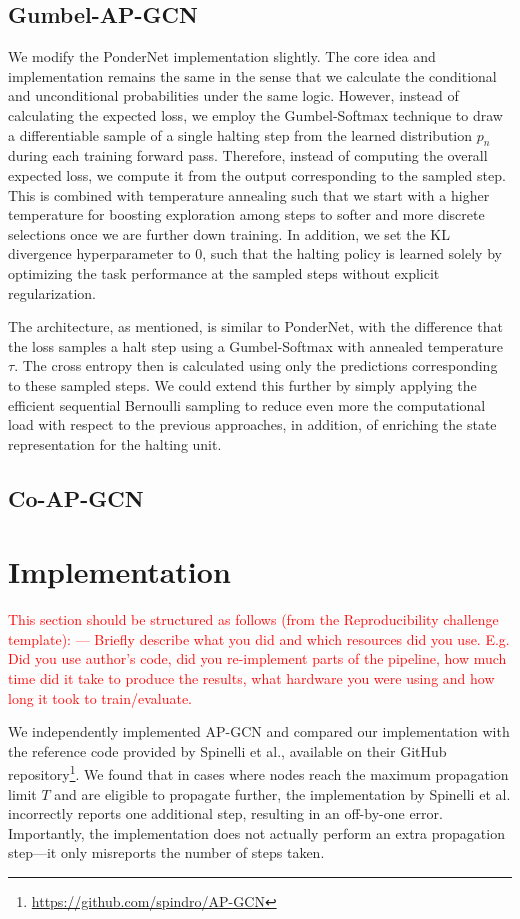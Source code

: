 \documentclass{gdl}
\begin{document}
\subsection{Gumbel-AP-GCN}
We modify the PonderNet implementation slightly. The core idea and implementation remains the same in the sense that we calculate the conditional and unconditional probabilities under the same logic. However, instead of calculating the expected loss, we employ the Gumbel-Softmax technique to draw a differentiable sample of a single halting step from the learned distribution $p_n$ during each training forward pass. Therefore, instead of computing the overall expected loss, we compute it from the output corresponding to the sampled step. This is combined with temperature annealing such that we start with a higher temperature for boosting exploration among steps to softer and more discrete selections once we are further down training. In addition, we set the KL divergence hyperparameter to 0, such that the halting policy is learned solely by optimizing the task performance at the sampled steps without explicit regularization. 

The architecture, as mentioned, is similar to PonderNet, with the difference that the loss samples a halt step using a Gumbel-Softmax with annealed temperature $\tau$. The cross entropy then is calculated using only the predictions corresponding to these sampled steps.  We could extend this further by simply applying the efficient sequential Bernoulli sampling to reduce even more the computational load with respect to the previous approaches, in addition, of enriching the state representation for the halting unit. 

\subsection{Co-AP-GCN}

\section{Implementation}

\textcolor{red}{
This section should be structured as follows (from the Reproducibility challenge template):
---
Briefly describe what you did and which resources did you use. E.g. Did you use author's code, did you re-implement parts of the pipeline, how much time did it take to produce the results, what hardware you were using and how long it took to train/evaluate. }

We independently implemented AP-GCN and compared our implementation with the reference code provided by Spinelli et al., available on their GitHub repository\footnote{\url{https://github.com/spindro/AP-GCN}}. We found that in cases where nodes reach the maximum propagation limit $T$ and are eligible to propagate further, the implementation by Spinelli et al. incorrectly reports one additional step, resulting in an off-by-one error. Importantly, the implementation does not actually perform an extra propagation step—it only misreports the number of steps taken.
\end{document}
